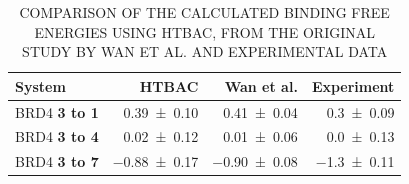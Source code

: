\begin{table}
  \centering
  \caption{COMPARISON OF THE CALCULATED BINDING FREE ENERGIES USING HTBAC, FROM THE ORIGINAL STUDY BY WAN ET AL. AND EXPERIMENTAL DATA}  
  \begin{tabular}{lrrr}
    \toprule
    System & HTBAC & Wan et al. & Experiment \\
    \midrule
    BRD4 \textbf{3 to 1} & \num{0.39 +- 0.10} &   \num{0.41 +- 0.04} &  \num{0.3 +- 0.09} \\
    BRD4 \textbf{3 to 4} & \num{0.02 +- 0.12} &   \num{0.01 +- 0.06} &  \num{0.0 +- 0.13} \\
    BRD4 \textbf{3 to 7} & \num{-0.88 +- 0.17} &  \num{-0.90 +- 0.08} & \num{-1.3 +- 0.11} \\
    \bottomrule
  \end{tabular}
  \label{tab:exp2}
\end{table}





